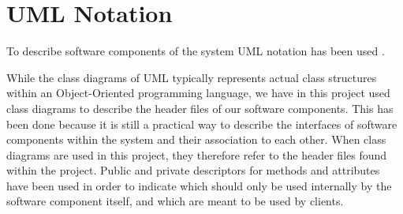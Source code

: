 \section{UML Notation}
\label{section:UMLNotation}

To describe software components of the system UML notation has been used \cite{UML}.

While the class diagrams of UML typically represents actual class structures within an Object-Oriented programming language, we have in this project used class diagrams to describe the header files of our software components. This has been done because it is still a practical way to describe the interfaces of software components within the system and their association to each other. When class diagrams are used in this project, they therefore refer to the header files found within the project. Public and private descriptors for methods and attributes have been used in order to indicate which should only be used internally by the software component itself, and which are meant to be used by clients.